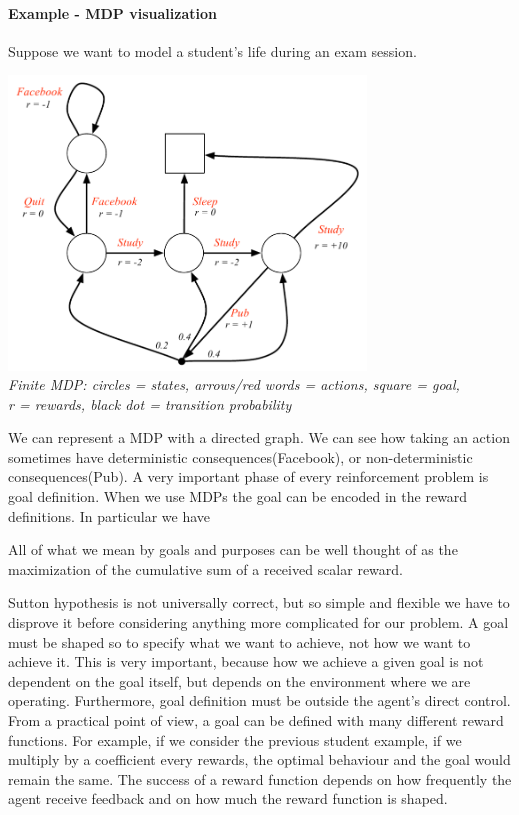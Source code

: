 \documentclass[../main.tex]{subfiles}
\begin{document}
\paragraph{Example - MDP visualization} Suppose we want to model a student's life during an exam session.
\begin{center}
    \includegraphics[width=95mm]{images/MDP.PNG}\\
    \textit{Finite MDP: circles = states, arrows/red words = actions, square = goal,}\\
    \textit{r = rewards, black dot = transition probability}
\end{center}
We can represent a MDP with a directed graph. We can see how taking an action sometimes have deterministic consequences(Facebook), or non-deterministic consequences(Pub).
\newline
\newline
A very important phase of every reinforcement problem is goal definition. When we use MDPs the goal can be encoded in the reward definitions. In particular we have
\begin{definition}
    All of what we mean by goals and purposes can be well thought of as the maximization of the cumulative sum of a received scalar reward.
\end{definition}
Sutton hypothesis is not universally correct, but so simple and flexible we have to disprove it before considering anything more complicated for our problem.
A goal must be shaped so to specify what we want to achieve, not how we want to
achieve it. This is very important, because how we achieve a given goal is not dependent on the goal itself, but depends on the environment where we are operating. Furthermore, goal definition must be outside the agent’s direct control. From a practical point of view, a goal can be defined with many different reward functions. For example, if we consider the previous student example, if we multiply by a coefficient every rewards, the optimal behaviour and the goal would remain the same. The success of a reward function depends on how frequently the agent receive feedback and on how much the reward function is shaped\footnotemark. 
\end{document}
